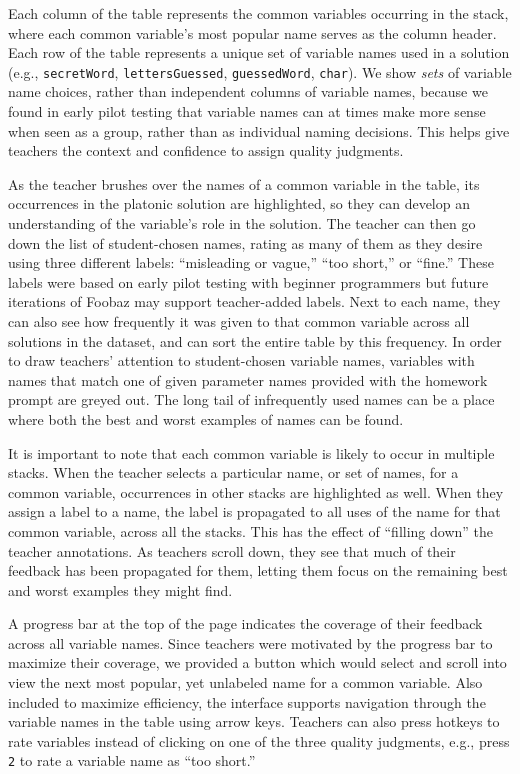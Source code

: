 Each column of the table represents the common variables occurring in the stack, where each common variable's most popular name serves as the column header. Each row of the table represents a unique set of variable names used in a solution (e.g., \texttt{secretWord}, \texttt{lettersGuessed}, \texttt{guessedWord}, \texttt{char}). We show \emph{sets} of variable name choices, rather than independent columns of variable names, because we found in early pilot testing that variable names can at times make more sense when seen as a group, rather than as individual naming decisions. This helps give teachers the context and confidence to assign quality judgments.

As the teacher brushes over the names of a common variable in the table, its occurrences in the platonic solution are highlighted, so they can develop an understanding of the variable's role in the solution. The teacher can then go down the list of student-chosen names, rating as many of them as they desire using three different labels: ``misleading or vague,'' ``too short,'' or ``fine.'' These labels were based on early pilot testing with beginner programmers but future iterations of Foobaz may support teacher-added labels. Next to each name, they can also see how frequently it was given to that common variable across all solutions in the dataset, and can sort the entire table by this frequency. In order to draw teachers' attention to student-chosen variable names, variables with names that match one of given parameter names provided with the homework prompt are greyed out. The long tail of infrequently used names can be a place where both the best and worst examples of names can be found.

It is important to note that each common variable is likely to occur in multiple stacks. When the teacher selects a particular name, or set of names, for a common variable, occurrences in other stacks are highlighted as well. When they assign a label to a name, the label is propagated to all uses of the name for that common variable, across all the stacks. This has the effect of ``filling down'' the teacher annotations. As teachers scroll down, they see that much of their feedback has been propagated for them, letting them focus on the remaining best and worst examples they might find. 

A progress bar at the top of the page indicates the coverage of their feedback across all variable names. Since teachers were motivated by the progress bar to maximize their coverage, we provided a button which would select and scroll into view the next most popular, yet unlabeled name for a common variable. Also included to maximize efficiency, the interface supports navigation through the variable names in the table using arrow keys. Teachers can also press hotkeys to rate variables instead of clicking on one of the three quality judgments, e.g., press \texttt{2} to rate a variable name as ``too short.''


